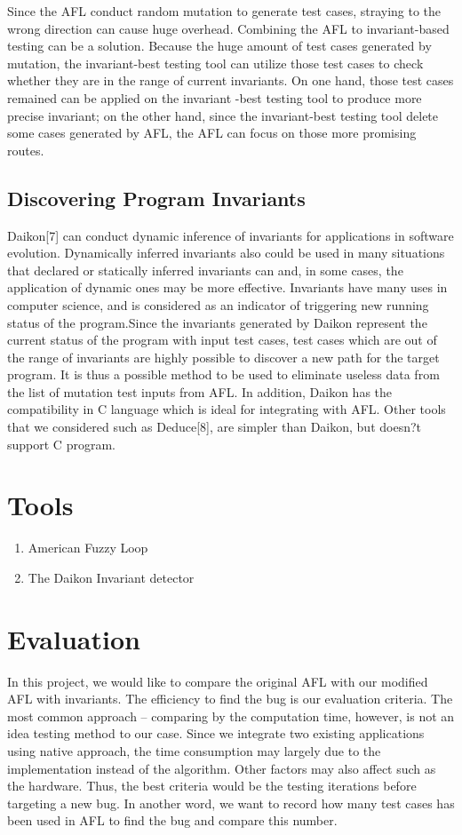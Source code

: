 \documentclass[sigplan,10pt,review]{acmart}\settopmatter{printfolios=true,printccs=false,printacmref=false}
\begin{document}
Since the AFL conduct random mutation to generate test cases, straying to the wrong direction can cause huge overhead. Combining the AFL to invariant-based testing can be a solution. Because the huge amount of test cases generated by mutation, the invariant-best testing tool can utilize those test cases to check whether they are in the range of current invariants. On one hand, those test cases remained can be applied on the invariant -best testing tool to produce more precise invariant; on the other hand, since the invariant-best testing tool delete some cases generated by AFL, the AFL can focus on those more promising routes.

\subsection{Discovering Program Invariants} 
Daikon[7] can conduct dynamic inference of invariants for applications in software evolution. Dynamically inferred invariants also could be used in many situations that declared or statically inferred invariants can and, in some cases, the application of dynamic ones may be more effective. Invariants have many uses in computer science, and is considered as an indicator of triggering new running status of the program.Since the invariants generated by Daikon represent the current status of the program with input test cases, test cases which are out of the range of invariants are highly possible to discover a new path for the target program. It is thus a possible method to be used to eliminate useless data from the list of mutation test inputs from AFL. In addition, Daikon has the compatibility in C language which is ideal for integrating with AFL. Other tools that we considered such as Deduce[8], are simpler than Daikon, but doesn?t support C program.

\section{Tools}

\begin{enumerate}
\item American Fuzzy Loop
\item The Daikon Invariant detector
\end{enumerate}

\section{Evaluation}
In this project, we would like to compare the original AFL with our modified AFL with invariants. The efficiency to find the bug is our evaluation criteria. The most common approach -- comparing by the computation time, however, is not an idea testing method to our case. Since we integrate two existing applications using native approach, the time consumption may largely due to the implementation instead of the algorithm. Other factors may also affect such as the hardware. Thus, the best criteria would be the testing iterations before targeting a new bug. In another word, we want to record how many test cases has been used in AFL to find the bug and compare this number.
\end{document}
